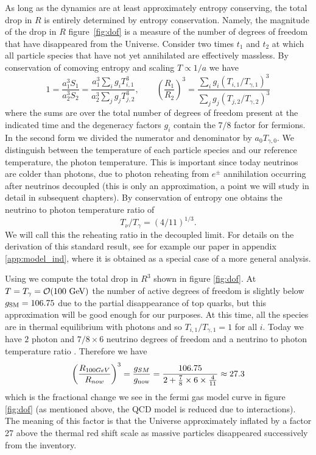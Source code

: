 As long as the dynamics are at least approximately entropy conserving, the total drop in $R$ is entirely determined by entropy conservation. Namely, the magnitude of the drop in $R$ figure~\ref{fig:dof} is a measure of the number of degrees of freedom that have disappeared from the Universe. Consider   two times $t_1$ and $t_2$ at which all particle species that have not yet annihilated are effectively massless.  By conservation of comoving entropy and  scaling $T\propto 1/a$ we have
\begin{equation}\label{r_ratio}
1=\frac{a_1^3S_{1}}{a_2^3 S_2}=\frac{a_1^3\sum_ig_i T_{i,1}^3}{a_2^3\sum_j g_j T_{j,2}^3},\qquad \left(\frac{R_1}{R_2}\right)^3=\frac{\sum_ig_i (T_{i,1}/T_{\gamma,1})^3}{\sum_j g_j (T_{j,2}/T_{\gamma,2})^3}
\end{equation}
where the sums are over the total number of degrees of freedom present at the indicated time and the degeneracy factors $g_i$ contain the $7/8$ factor for fermions. In the second form    we divided the numerator and denominator by $a_{0}T_{\gamma,0}$. We distinguish between the temperature of each particle species and our reference temperature, the photon temperature.  This is important since today neutrinos are colder than photons, due to photon reheating from  $e^\pm$ annihilation occurring after neutrinos decoupled (this is only an approximation, a point we will study in detail in subsequent chapters).  By conservation of entropy one obtains the neutrino to photon temperature ratio of
\begin{equation}\label{T_nu_T_gamma}
T_\nu/T_\gamma=({4}/{11})^{1/3}.
\end{equation}
We will call this the reheating ratio in the decoupled limit.  For details on the derivation of this standard result, see for example our paper in appendix \ref{app:model_ind}, where it is obtained as a special case of a more general analysis. 

Using   we  compute the total drop in $R^3$ shown in figure \ref{fig:dof}.  At $T=T_\gamma=\mathcal{O}(100\text{ GeV})$ the number of active degrees of freedom is slightly below $g_{\rm SM}=106.75$ due to the partial disappearance of top quarks, but this approximation will be good enough for our purposes.  At this time, all the species are in thermal equilibrium with photons and so $T_{i,1}/T_{\gamma,1}=1$ for all $i$.  Today we have $2$ photon and $7/8\times 6$ neutrino degrees of freedom and a  neutrino to photon temperature ratio .  Therefore we have
\begin{equation}
\left(\frac{R_{100GeV}}{R_{now}}\right)^3= \frac{g_{SM}}{g_{\rm now}}=\frac{106.75}{2+\frac{7}{8}\times 6\times \frac{4}{11}}\approx 27.3
\end{equation}
which is the  fractional change we see in the fermi gas model curve in figure \ref{fig:dof} (as mentioned above, the QCD model is reduced due to interactions). The meaning of this factor is that the Universe approximately inflated by a factor 27 above the thermal red shift scale as massive particles disappeared successively from the inventory. 


